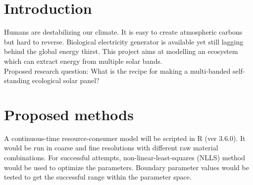 \documentclass[a4paper, 11pt]{article}
\begin{document}
\section{Introduction}
Humans are destabilizing our climate\autocite{schuur2015climate}.  It is easy to create atmospheric carbons but hard to reverse\autocite{yang2008progress}.  Biological electricity generator is available\autocite{mccormick2015biophotovoltaics} yet still lagging behind the global energy thirst\autocite{ferguson2000electricity}.  This project aims at modelling an ecosystem which can extract energy from multiple solar bands.\\
Proposed research question: What is the recipe for making a multi-banded self-standing ecological solar panel?
\section{Proposed methods}
A continuous-time resource-consumer model will be scripted in R (ver 3.6.0).  It would be run in coarse and fine resolutions with different raw material combinations.  For successful attempts, non-linear-least-squares (NLLS) method would be used to optimize the parameters.  Boundary parameter values would be tested to get the successful range within the parameter space.
\end{document}
